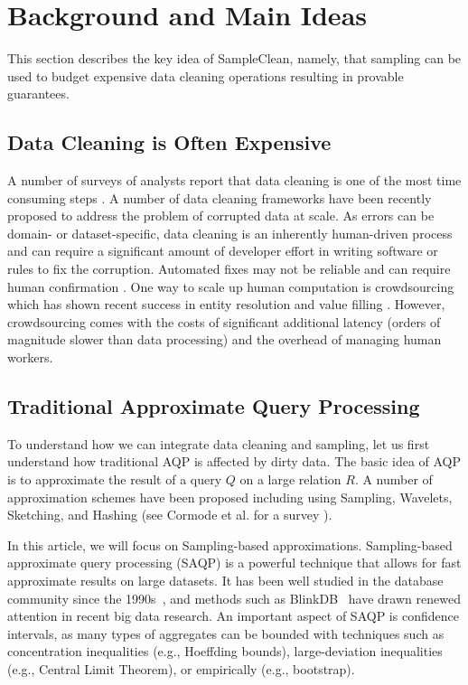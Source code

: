 \section{Background and Main Ideas}

This section describes the key idea of SampleClean, namely, that sampling can be used to budget expensive data cleaning operations resulting in provable guarantees.

\subsection{Data Cleaning is Often Expensive}
A number of surveys of analysts report that data cleaning is one of the most time consuming steps \cite{kandel2012enterprise, nytimes}.
A number of data cleaning frameworks have been recently proposed to address the problem of corrupted data at scale\cite{khayyat2015bigdansing, chu2015katara, sampleclean}.
As errors can be domain- or dataset-specific, data cleaning is an inherently human-driven process and can require a significant amount of developer effort in writing software or rules to fix the corruption.
Automated fixes may not be reliable and can require human confirmation \cite{DBLP:journals/pvldb/YakoutENOI11}.
One way to scale up human computation is crowdsourcing which has shown recent success in entity resolution and value filling \cite{gokhale2014corleone, park2014crowdfill, sampleclean,chu2015katara}.
However, crowdsourcing comes with the costs of significant additional latency (orders of magnitude slower than data processing) and the overhead of managing human workers.

\subsection{Traditional Approximate Query Processing}
To understand how we can integrate data cleaning and sampling, let us first understand how traditional AQP is affected by dirty data.
The basic idea of AQP is to approximate the result of a query $Q$ on a large relation $R$.
A number of approximation schemes have been proposed including using Sampling, Wavelets, Sketching, and Hashing (see Cormode et al. for a survey \cite{DBLP:journals/ftdb/CormodeGHJ12}).

In this article, we will focus on Sampling-based approximations.
Sampling-based approximate query processing (SAQP) is a powerful technique that allows for fast approximate results on large datasets. 
It has been well studied in the database community since the 1990s~\cite{DBLP:conf/sigmod/HellersteinHW97,DBLP:conf/sigmod/AcharyaGPR99,DBLP:conf/icde/OlkenR92, OlkenR86}, and methods such as BlinkDB~\cite{DBLP:conf/eurosys/AgarwalMPMMS13} have drawn renewed attention in recent big data research. 
An important aspect of SAQP is confidence intervals, as many types of aggregates can be bounded with techniques such as concentration inequalities (e.g., Hoeffding bounds), large-deviation inequalities (e.g., Central Limit Theorem), or empirically (e.g., bootstrap). 

